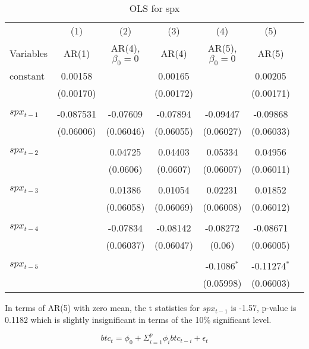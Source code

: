 \documentclass{article}
\begin{document}
\begin{table}[h!]
\begin{center}
\begin{tabular}{lcccccc} 
     & (1) & (2) & (3)  & (4)  & (5)  \\
    Variables &  AR(1)  &  AR(4), $\beta_0=0$  &  AR(4) &   AR(5), $\beta_0=0$  &  AR(5)\\
    \hline
    constant  &   0.00158  &  &  0.00165  & &  0.00205 \\
     &  (0.00170)  &  & (0.00172)  & & (0.00171) \\
     & & & & & \\
    $spx_{t-1}$  &  -0.087531  &  -0.07609  &  -0.07894  &  -0.09447  & -0.09868   \\
     &  (0.06006)  &  (0.06046)  &  (0.06055)  &  (0.06027)  & (0.06033) \\
     & & & & & \\
    $spx_{t-2}$  &  &  0.04725   &  0.04403  &  0.05334 &  0.04956  \\
      & &  (0.0606)  &  (0.0607)  &  (0.06007)  & (0.06011) \\
      & & & & & \\
    $spx_{t-3}$  &  &  0.01386   &  0.01054  &  0.02231 &  0.01852 \\
      & &  (0.06058)  &  (0.06069)  &  (0.06008)  & (0.06012) \\
      & & & & & \\
    $spx_{t-4}$  &  &  -0.07834  &  -0.08142  &  -0.08272 &  -0.08671   \\
      & &  (0.06037)  &  (0.06047)  &  (0.06)  & (0.06005) \\
      & & & & & \\
    $spx_{t-5}$  &  &  &  &  -0.1086$^{\ast}$  &  -0.11274$^{\ast}$  \\
      & &    &  &  (0.05998)  & (0.06003) \\
    \hline
\end{tabular}
\caption{OLS for spx}
\end{center}
\end{table}

In terms of AR(5) with zero mean, the t statistics for $spx_{t-1}$ is -1.57, 
p-value is 0.1182 which is slightly insignificant in terms of the 10\% significant
level. 

\newpage

$$
btc_t = \phi_0 + \Sigma_{i=1}^p \phi_i btc_{t-i} + \epsilon_t
$$
\end{document}
